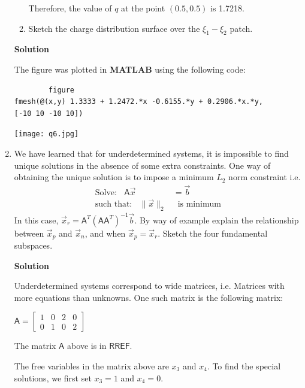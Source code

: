 \documentclass[a4paper, 11pt]{article}
\newcommand{\mat}[1]{\boldsymbol { \mathsf{#1}} }
\begin{document}
\begin{enumerate}
\begin{enumerate}[label=(\alph*)]
    Therefore, the value of $q$ at the point $(0.5, 0.5)$ is 1.7218.
    
    \item Sketch the charge distribution surface over the $\xi_{1} - \xi_{2}$ patch.
\end{enumerate}

\textbf{Solution}

    The figure was plotted in \textbf{MATLAB} using the following code:
    
    \begin{verbatim}
        figure
fmesh(@(x,y) 1.3333 + 1.2472.*x -0.6155.*y + 0.2906.*x.*y,
[-10 10 -10 10])
    \end{verbatim}
    
    \begin{center}
        \texttt{[image: q6.jpg]}
    \end{center}

\item We have learned that for underdetermined systems, it is impossible to find unique solutions in the absence of some extra constraints. One way of obtaining the unique solution is to impose a minimum $L_2$ norm constraint i.e.
\begin{align}
\text{Solve: } \;\; \mat A \vec x &= \vec b \\
\text{such that: } \;\; \|\vec x\|_2 &\;\; \text{is minimum}
\end{align}
In this case, $\vec x_r = \mat A^T (\mat A \mat A^T)^{-1} \vec b$. By way of example explain the relationship between $\vec x_p$ and $\vec x_n$, and when $\vec x_p = \vec x_r$. Sketch the four fundamental subspaces.

\textbf{Solution}

Underdetermined systems correspond to wide matrices, i.e. Matrices with more equations than unknowns. One such matrix is the following matrix:

\begin{center}
    $\mat{A} = \begin{bmatrix}
           1 & 0 & 2 & 0 \\
           0 & 1 & 0 & 2
    \end{bmatrix}$
\end{center}

The matrix $\mat{A}$ above is in $\mat{RREF}$.

The free variables in the matrix above are $x_3$ and $x_4$. To find the special solutions, we first set $x_3 = 1$ and $x_4 = 0$.


\end{enumerate}
\end{document}
